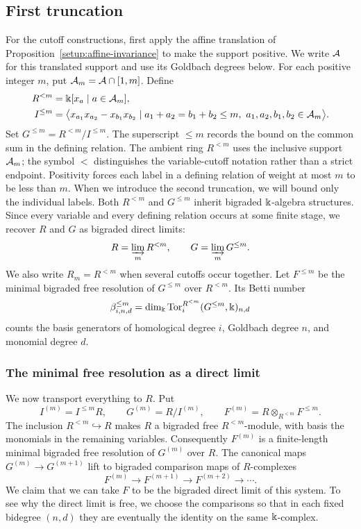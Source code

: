 \subsection{First truncation}
For the cutoff constructions, first apply the affine translation of
Proposition~\ref{setup:affine-invariance} to make the support positive.
We write $\mathcal A$ for this translated support and use its Goldbach degrees
below. For each positive integer $m$, put $\mathcal A_m=\mathcal A\cap[1,m]$. Define
\[
 \begin{aligned}
 R^{<m}&=\Bbbk[x_a\mid a\in\mathcal A_m],\\
 I^{\le m}&=\bigl\langle x_{a_1}x_{a_2}-x_{b_1}x_{b_2}\mid
 a_1+a_2=b_1+b_2\le m,\ a_1,a_2,b_1,b_2\in\mathcal A_m\bigr\rangle .
 \end{aligned}
\]
Set $G^{\le m}=R^{<m}/I^{\le m}$. The superscript $\le m$ records the
bound on the common sum in the defining relation. The ambient ring
$R^{<m}$ uses the inclusive support $\mathcal A_m$; the symbol $<$ distinguishes
the variable-cutoff notation rather than a strict endpoint. Positivity
forces each label in a defining relation of weight at most $m$ to be
less than $m$. When
we introduce the second truncation, we will bound only the individual
labels. Both $R^{<m}$ and $G^{\le m}$ inherit bigraded $\Bbbk$-algebra
structures. Since every variable and every defining relation occurs at
some finite stage, we recover $R$ and $G$ as bigraded direct limits:
\[
 R=\varinjlim_m R^{<m},\qquad G=\varinjlim_m G^{\le m}.
\]
We also write $R_m=R^{<m}$ when several cutoffs occur together.
Let $F^{\le m}$ be the minimal bigraded free resolution of $G^{\le m}$
over $R^{<m}$. Its Betti number
\[
 \beta^{\le m}_{i,n,d}
   =\dim_\Bbbk\operatorname{Tor}_i^{R^{<m}}(G^{\le m},\Bbbk)_{n,d}
\]
counts the basis generators of homological degree $i$, Goldbach
degree $n$, and monomial degree $d$.

\subsubsection{The minimal free resolution as a direct limit}
We now transport everything to $R$. Put
\begin{equation}\label{setup:first-base-change}
 I^{(m)}=I^{\le m}R,\qquad G^{(m)}=R/I^{(m)},\qquad
 F^{(m)}=R\otimes_{R^{<m}} F^{\le m}.
\end{equation}
The inclusion $R^{<m}\hookrightarrow R$ makes $R$ a bigraded free
$R^{<m}$-module, with basis the monomials in the remaining variables.
Consequently $F^{(m)}$ is a finite-length minimal bigraded free
resolution of $G^{(m)}$ over $R$. The canonical maps
$G^{(m)}\to G^{(m+1)}$ lift to bigraded comparison maps of $R$-complexes
\begin{equation}\label{setup:first-comparisons}
 F^{(m)}\longrightarrow F^{(m+1)}\longrightarrow F^{(m+2)}
 \longrightarrow\cdots.
\end{equation}
We claim that we can take $F$ to be the bigraded direct limit of this
system. To see why the direct limit is free, we choose the comparisons
so that in each fixed bidegree $(n,d)$ they are eventually the identity
on the same $\Bbbk$-complex.

